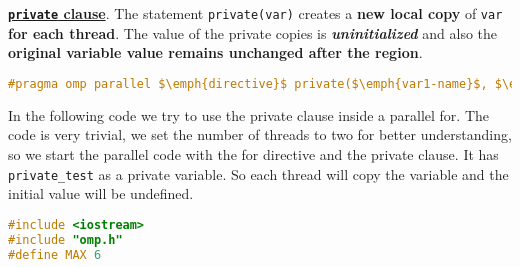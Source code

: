 \highspace
\textbf{\underline{\texttt{private} clause}}. The statement \texttt{private(var)} creates a \textbf{new local copy} of \texttt{var} \textbf{for each thread}. The value of the private copies is \textbf{\emph{uninitialized}} and also the \textbf{original variable value remains unchanged after the region}.
\begin{openmpbox}
    \begin{lstlisting}[language=C++, mathescape=true]
#pragma omp parallel $\emph{directive}$ private($\emph{var1-name}$, $\emph{var2-name}$, ...)\end{lstlisting}
\end{openmpbox}
\begin{examplebox}
    In the following code we try to use the private clause inside a parallel for. The code is very trivial, we set the number of threads to two for better understanding, so we start the parallel code with the for directive and the private clause. It has \texttt{private\_test} as a private variable. So each thread will copy the variable and the initial value will be undefined.
    \begin{lstlisting}[language=C++]
#include <iostream>
#include "omp.h"
#define MAX 6


\end{lstlisting}
\end{examplebox}
